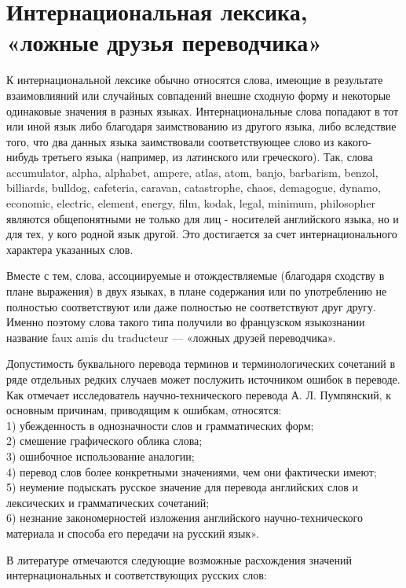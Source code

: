 \section{Интернациональная лексика, «ложные друзья переводчика»}

К интернациональной лексике обычно относятся слова, имеющие в результате взаимовлияний или случайных совпадений внешне сходную форму и некоторые одинаковые значения в разных языках. Интернациональные слова попадают в тот или иной язык либо благодаря заимствованию из другого языка, либо вследствие того, что два данных языка заимствовали соответствующее слово из какого-нибудь третьего языка (например, из латинского или греческого). Так, слова accumulator, alpha, alphabet, ampere, atlas, atom, banjo, barbarism, benzol, billiards, bulldog, cafeteria, caravan, catastrophe, chaos, demagogue, dynamo, economic, electric, element, energy, film, kodak, legal, minimum, philosopher являются общепонятными не только для лиц - носителей английского языка, но и для тех, у кого родной язык другой. Это достигается за счет интернационального характера указанных слов. 

Вместе с тем, слова, ассоциируемые и отождествляемые (благодаря сходству в плане выражения) в двух языках, в плане содержания или по употреблению не полностью соответствуют или даже полностью не соответствуют друг другу. Именно поэтому слова такого типа получили во французском языкознании название faux amis du traducteur --- «ложных друзей переводчика».

Допустимость буквального перевода терминов и терминологических сочетаний в ряде отдельных редких случаев может послужить источником ошибок в переводе. Как отмечает исследователь научно-технического перевода А. Л. Пумпянский, к основным причинам, приводящим к ошибкам, относятся:\\
 1) убежденность в однозначности слов и грамматических форм; \\
 2) смешение графического облика слова; \\
 3) ошибочное использование аналогии;\\
 4) перевод слов более конкретными значениями, чем они фактически имеют;\\
 5) неумение подыскать русское значение для перевода английских слов и лексических и грамматических сочетаний;\\
 6) незнание закономерностей изложения английского научно-технического материала и способа его передачи на русский язык».

В литературе отмечаются следующие возможные расхождения значений интернациональных и соответствующих русских слов: 

